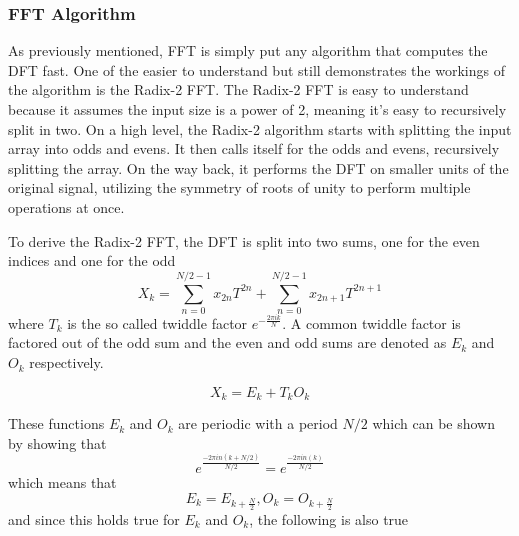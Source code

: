 




\subsubsection{FFT Algorithm}
As previously mentioned, FFT is simply put any algorithm that computes the DFT fast. One of the easier to understand but still demonstrates the workings of the algorithm is the Radix-2 FFT. The Radix-2 FFT is easy to understand because it assumes the input size is a power of 2, meaning it's easy to recursively split in two. On a high level, the Radix-2 algorithm starts with splitting the input array into odds and evens. It then calls itself for the odds and evens, recursively splitting the array. On the way back, it performs the DFT on smaller units of the original signal, utilizing the symmetry of roots of unity to perform multiple operations at once. 

To derive the Radix-2 FFT, the DFT is split into two sums, one for the even indices and one for the odd 
$$X_k = \sum^{N/2-1}_{n=0} x_{2n}T^{2n}+ \sum^{N/2-1}_{n=0} x_{2n+1}T^{2n+1}$$
where $T_k$ is the so called twiddle factor $e^{-\frac{2\pi ik}{N}}$. A common twiddle factor is factored out of the odd sum and the even and odd sums are denoted as $E_k$ and $O_k$ respectively. 

$$X_k = E_k + T_kO_k$$

These functions $E_k$ and $O_k$ are periodic with a period $N/2$ which can be shown by showing that $$e^{\frac{-2\pi in(k+N/2)}{N/2}} = e^{\frac{-2\pi in(k)}{N/2}}$$
which means that 
$$E_k = E_{k+\frac{N}{2}}, O_k = O_{k+\frac{N}{2}}$$
and since this holds true for $E_k$ and $O_k$, the following is also true

